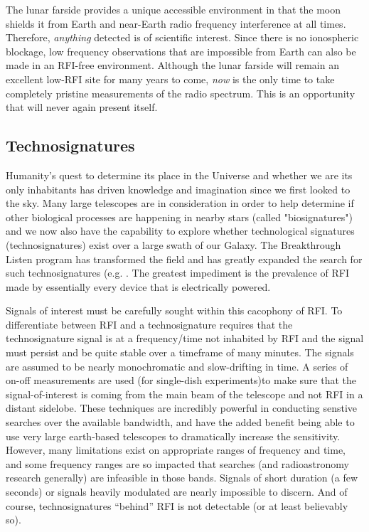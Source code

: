 The lunar farside provides a unique accessible environment in that the moon shields it from Earth and near-Earth radio frequency interference at all times.  Therefore, {\em anything} detected is of scientific interest. Since there is no ionospheric blockage, low frequency observations that are impossible from Earth can also be made in an RFI-free environment.  Although the lunar farside will remain an excellent low-RFI site for many years to come, {\em now} is the only time to take completely pristine measurements of the radio spectrum.  This is an opportunity that will never again present itself.

\subsection{Technosignatures}
Humanity's quest to determine its place in the Universe and whether we are its only inhabitants has driven knowledge and imagination since we first looked to the sky.  Many large telescopes are in consideration in order to help determine if other biological processes are happening in nearby stars (called "biosignatures") and we now also have the capability to explore whether technological signatures (technosignatures) exist over a large swath of our Galaxy.  The Breakthrough Listen program has transformed the field and has greatly expanded the search for such technosignatures (e.g. \citealt{Enriquez_2017, Price_2020, Gajjar_2021}.  The greatest impediment is the prevalence of RFI made by essentially every device that is electrically powered.

Signals of interest must be carefully sought within this cacophony of RFI. To differentiate between RFI and a technosignature requires that the technosignature signal is at a frequency/time not inhabited by RFI and the signal must persist and be quite stable over a timeframe of many minutes.  The signals are assumed to be nearly monochromatic and slow-drifting in time.  A series of on-off measurements are used (for single-dish experiments)to make sure that the signal-of-interest is coming from the main beam of the telescope and not RFI in a distant sidelobe.  These techniques are incredibly powerful in conducting senstive searches over the available bandwidth, and have the added benefit being able to use very large earth-based telescopes to dramatically increase the sensitivity.  However, many limitations exist on appropriate ranges of frequency and time, and some frequency ranges are so impacted that searches (and radioastronomy research generally) are infeasible in those bands.  Signals of short duration (a few seconds) or signals heavily modulated are nearly impossible to discern.  And of course, technosignatures ``behind'' RFI is not detectable (or at least believably so).

